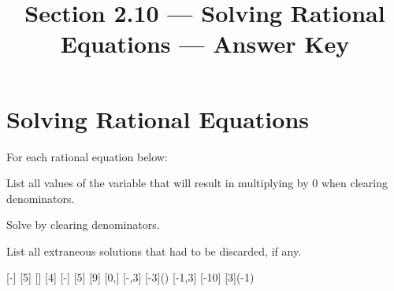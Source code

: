 

\title{Section 2.10 --- Solving Rational Equations --- Answer Key}



\maketitle
\section*{Solving Rational Equations}
For each rational equation below:
\begin{clist}
\item List all values of the variable that will result in multiplying by 0 when clearing denominators.
\item Solve by clearing denominators.
\item List all extraneous solutions that had to be discarded, if any.
\end{clist}
\begin{smenum}
\mitemxxx
{[-]}
{[5]}
{[]}
\mitemxxx
{[4]}
{[-]}
{[5]}
\mitemxxx
{[9]}
{[0,]}
{[-,3]}
\mitemxxx
{[-3]()}
{[-1,3]}
{[-10]}
\mitemxxo
{}
{[3](-1)}
\end{smenum}

